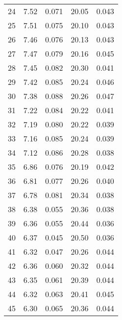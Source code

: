 \begin{table}
\begin{tabular}{c|ll|ll}
24 & 7.52 & 0.071 & 20.05 & 0.043 \\
25 & 7.51 & 0.075 & 20.10 & 0.043 \\
26 & 7.46 & 0.076 & 20.13 & 0.043 \\
27 & 7.47 & 0.079 & 20.16 & 0.045 \\
28 & 7.45 & 0.082 & 20.30 & 0.041 \\
29 & 7.42 & 0.085 & 20.24 & 0.046 \\
30 & 7.38 & 0.088 & 20.26 & 0.047 \\
31 & 7.22 & 0.084 & 20.22 & 0.041 \\
32 & 7.19 & 0.080 & 20.22 & 0.039 \\
33 & 7.16 & 0.085 & 20.24 & 0.039 \\
34 & 7.12 & 0.086 & 20.28 & 0.038 \\
35 & 6.86 & 0.076 & 20.19 & 0.042 \\
36 & 6.81 & 0.077 & 20.26 & 0.040 \\
37 & 6.78 & 0.081 & 20.34 & 0.038 \\
38 & 6.38 & 0.055 & 20.36 & 0.038 \\
39 & 6.36 & 0.055 & 20.44 & 0.036 \\
40 & 6.37 & 0.045 & 20.50 & 0.036 \\
41 & 6.32 & 0.047 & 20.26 & 0.044 \\
42 & 6.36 & 0.060 & 20.32 & 0.044 \\
43 & 6.35 & 0.061 & 20.39 & 0.044 \\
44 & 6.32 & 0.063 & 20.41 & 0.045 \\
45 & 6.30 & 0.065 & 20.36 & 0.044 \\
               \hline
        \end{tabular}
    \end{table}
    \clearpage

